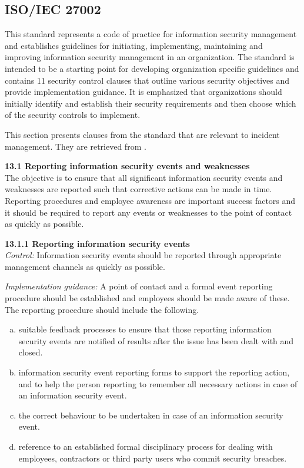 \subsection{\acs{ISO}/\acs{IEC} 27002}
\label{sec:iso27002}
This standard represents a code of practice for information security management and establishes guidelines for initiating, implementing, maintaining and improving information security management in an organization. The standard is intended to be a starting point for developing organization specific guidelines and contains 11 security control clauses that outline various security objectives and provide implementation guidance. It is emphasized that organizations should initially identify and establish their security requirements and then choose which of the security controls to implement.

This section presents clauses from the standard that are relevant to incident management. They are retrieved from \cite{ISO/IEC27002}.

\textbf{13.1 Reporting information security events and weaknesses } \\
The objective is to ensure that all significant information security events and weaknesses are reported such that corrective actions can be made in time. Reporting procedures and employee awareness are important success factors and it should be required to report any events or weaknesses to the point of contact as quickly as possible.

\textbf{13.1.1 Reporting information security events} \\
\emph{Control:} Information security events should be reported through appropriate management channels as quickly as possible.

\emph{Implementation guidance:} A point of contact and a formal event reporting procedure should be established and employees should be made aware of these. The reporting procedure should include the following.
\begin{enumerate}[a)]
\item suitable feedback processes to ensure that those reporting information security events are notified of results after the issue has been dealt with and closed.
\item information security event reporting forms to support the reporting action, and to help the person reporting to remember all necessary actions in case of an information security event.
\item the correct behaviour to be undertaken in case of an information security event.
\item reference to an established formal disciplinary process for dealing with employees, contractors or third party users who commit security breaches.
\end{enumerate}

